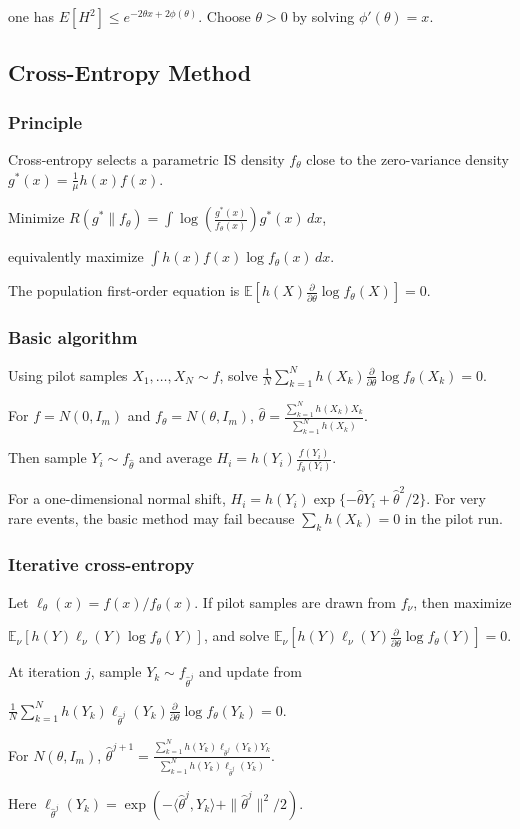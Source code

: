 one has $E[H^2]\le e^{-2\theta x+2\phi(\theta)}$. Choose $\theta>0$ by solving $\phi'(\theta)=x$.

\subsection{Cross-Entropy Method}

\subsubsection*{Principle}

Cross-entropy selects a parametric IS density $f_\theta$ close to the zero-variance density
$g^*(x)=\frac{1}{\mu}h(x)f(x)$.

Minimize
$R(g^*\|f_\theta)=\int \log\left(\frac{g^*(x)}{f_\theta(x)}\right)g^*(x)\,dx$,

equivalently maximize
$\int h(x)f(x)\log f_\theta(x)\,dx$.

The population first-order equation is
$\mathbb{E}\left[h(X)\frac{\partial}{\partial\theta}\log f_\theta(X)\right]=0$.

\subsubsection*{Basic algorithm}

Using pilot samples $X_1,\ldots,X_N\sim f$, solve
$\frac{1}{N}\sum_{k=1}^Nh(X_k)\frac{\partial}{\partial\theta}\log f_\theta(X_k)=0$.

For $f=N(0,I_m)$ and $f_\theta=N(\theta,I_m)$,
$\hat{\theta}=\frac{\sum_{k=1}^Nh(X_k)X_k}{\sum_{k=1}^Nh(X_k)}$.

Then sample $Y_i\sim f_{\hat{\theta}}$ and average
$H_i=h(Y_i)\frac{f(Y_i)}{f_{\hat{\theta}}(Y_i)}$.

For a one-dimensional normal shift, $H_i=h(Y_i)\exp\{-\hat{\theta}Y_i+\hat{\theta}^2/2\}$. For very rare events, the basic method may fail because $\sum_kh(X_k)=0$ in the pilot run.

\subsubsection*{Iterative cross-entropy}

Let $\ell_\theta(x)=f(x)/f_\theta(x)$. If pilot samples are drawn from $f_\nu$, then maximize

$\mathbb{E}_\nu[h(Y)\ell_\nu(Y)\log f_\theta(Y)]$,
and solve
$\mathbb{E}_\nu\left[h(Y)\ell_\nu(Y)\frac{\partial}{\partial\theta}\log f_\theta(Y)\right]=0$.

At iteration $j$, sample $Y_k\sim f_{\hat{\theta}^j}$ and update from

$\frac{1}{N}\sum_{k=1}^Nh(Y_k)\ell_{\hat{\theta}^j}(Y_k)\frac{\partial}{\partial\theta}\log f_\theta(Y_k)=0$.

For $N(\theta,I_m)$,
$\hat{\theta}^{j+1}=\frac{\sum_{k=1}^Nh(Y_k)\ell_{\hat{\theta}^j}(Y_k)Y_k}{\sum_{k=1}^Nh(Y_k)\ell_{\hat{\theta}^j}(Y_k)}$.

Here
$\ell_{\hat{\theta}^j}(Y_k)=\exp(-\langle\hat{\theta}^j,Y_k\rangle+\|\hat{\theta}^j\|^2/2)$.
